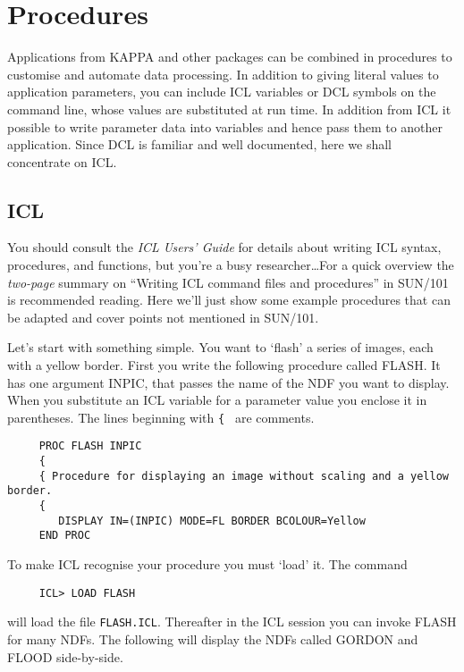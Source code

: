 {\section{Procedures}
Applications from {\small KAPPA} and other packages can be combined
in procedures to customise and automate data processing. In addition to
giving literal values to application parameters, you can include {\small
ICL} variables or {\small DCL} symbols on the command line, whose values
are substituted at run time. In addition from {\small ICL} it possible to
write parameter data into variables and hence pass them to another
application. Since {\small DCL} is familiar and well documented,
here we shall concentrate on {\small ICL}.

\subsection{ICL}
\label{se:ICLproc}
You should consult the {\sl ICL Users' Guide} for details about writing
{\small ICL} syntax, procedures, and functions, but you're a busy
researcher\ldots  For a quick overview the {\em two-page\/} summary on
``Writing ICL command files and procedures'' in SUN/101 is recommended
reading. Here we'll just show some example procedures that can be
adapted and cover points not mentioned in SUN/101.

Let's start with something simple.  You want to `flash' a series of
images, each with a yellow border.  First you write the following
procedure called FLASH.  It has one argument INPIC, that passes the name of
the NDF you want to display.  When you substitute an {\small ICL}
variable for a parameter value you enclose it in parentheses.  The lines
beginning with {\tt \{ } are comments.

\small
\begin{verbatim}
     PROC FLASH INPIC
     {
     { Procedure for displaying an image without scaling and a yellow border.
     {
        DISPLAY IN=(INPIC) MODE=FL BORDER BCOLOUR=Yellow
     END PROC
\end{verbatim}
\normalsize
To make {\small ICL} recognise your procedure you must `load' it.  The
command

\small
\begin{verbatim}
     ICL> LOAD FLASH
\end{verbatim}
\normalsize
will load the file {\tt FLASH.ICL}.
Thereafter in the {\small ICL} session you can invoke FLASH for many
NDFs. The following will display the NDFs called GORDON and FLOOD
side-by-side.

}
